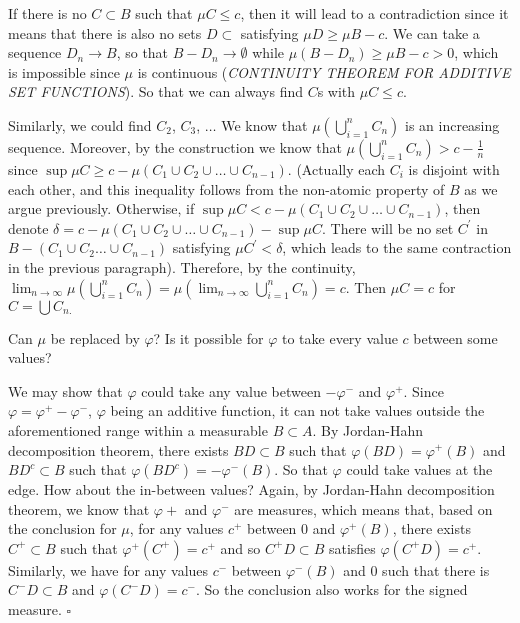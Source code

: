 \documentclass[
]{article}
\begin{document}
If there is no \(C\subset B\) such that \(\mu C \le c\), then it will
lead to a contradiction since it means that there is also no sets
\(D\subset\) satisfying \(\mu D \ge \mu B - c\). We can take a sequence
\(D_n \to B\), so that \(B-D_n \to \emptyset\) while
\(\mu(B-D_n) \ge \mu B -c > 0\), which is impossible since \(\mu\) is
continuous (\emph{CONTINUITY THEOREM FOR ADDITIVE SET FUNCTIONS}). So
that we can always find \(C\)\textquotesingle s with \(\mu C \le c\).

Similarly, we could find \(C_2\), \(C_3\), \(\dots\) We know that
\(\mu\left(\bigcup_{i=1}^n C_n\right)\) is an increasing sequence.
Moreover, by the construction we know that
\(\mu\left(\bigcup_{i=1}^n C_n\right) > c - \frac{1}{n}\) since
\(\sup \mu C \ge c - \mu\left(C_1 \cup C_2 \cup \ldots \cup C_{n-1}\right)\).
(Actually each \(C_i\) is disjoint with each other, and this inequality
follows from the non-atomic property of \(B\) as we argue previously.
Otherwise, if
\(\sup \mu C <c - \mu\left(C_1 \cup C_2 \cup \ldots \cup C_{n-1}\right)\),
then denote
\(\delta = c - \mu\left(C_1 \cup C_2 \cup \ldots \cup C_{n-1}\right) - \sup \mu C\).
There will be no set \(C^\prime\) in
\(B-\left(C_1 \cup C_2 \ldots \cup C_{n-1}\right)\) satisfying
\(\mu C^\prime < \delta\), which leads to the same contraction in the
previous paragraph). Therefore, by the continuity,
\(\lim_{n\to\infty} \mu\left(\bigcup_{i=1}^n C_n\right) = \mu\left(\lim_{n\to\infty}\bigcup_{i=1}^n C_n\right) = c\).
Then \(\mu C=c\) for \(C=\bigcup C_{n .}\)

Can \(\mu\) be replaced by \(\varphi\)? Is it possible for \(\varphi\)
to take every value \(c\) between some values?

We may show that \(\varphi\) could take any value between \(-\varphi^-\)
and \(\varphi^+\). Since \(\varphi = \varphi^+ - \varphi^-\),
\(\varphi\) being an additive function, it can not take values outside
the aforementioned range within a measurable \(B \subset A\). By
Jordan-Hahn decomposition theorem, there exists \(BD \subset B\) such
that \(\varphi(BD) = \varphi^+(B)\) and \(BD^c \subset B\) such that
\(\varphi(BD^c) = -\varphi^-(B)\). So that \(\varphi\) could take values
at the edge. How about the in-between values? Again, by Jordan-Hahn
decomposition theorem, we know that \(\varphi+\) and \(\varphi^-\) are
measures, which means that, based on the conclusion for \(\mu\), for any
values \(c^+\) between \(0\) and \(\varphi^+(B)\), there exists
\(C^+ \subset B\) such that \(\varphi^+(C^+) = c^+\) and so
\(C^+D \subset B\) satisfies \(\varphi(C^+D) = c^+\). Similarly, we have
for any values \(c^-\) between \(\varphi^-(B)\) and 0 such that there is
\(C^- D \subset B\) and \(\varphi(C^-D) = c^-\). So the conclusion also
works for the signed measure. \(\square\)
\end{document}
